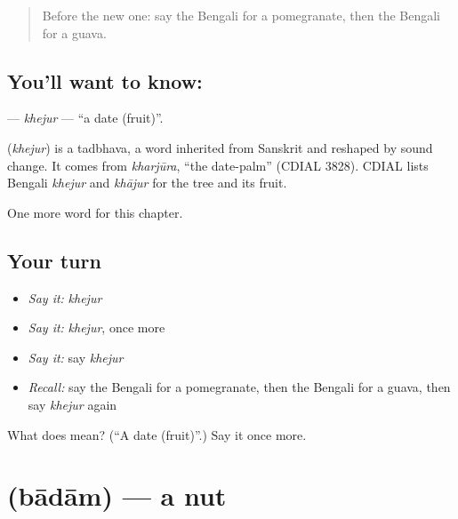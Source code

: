 \label{lesson:BN-C204-khejur}



\begin{quote}
Before the new one: say the Bengali for a pomegranate, then the Bengali for a guava.
\end{quote}

\subsection*{You'll want to know: }
\textbf{} — \emph{khejur} — \textquotedblleft{}a date (fruit)\textquotedblright{}.

\begin{cousinweb}
\textbf{} (\emph{khejur}) is a tadbhava, a word inherited from Sanskrit and reshaped by sound change. It comes from \emph{kharjūra}, \textquotedblleft{}the date-palm\textquotedblright{} (CDIAL 3828). CDIAL lists Bengali \emph{khejur} and \emph{khājur} for the tree and its fruit.
\end{cousinweb}

\begin{grammarlens}[title={What you've built}]
One more word for this chapter.
\end{grammarlens}

\subsection*{Your turn}
\begin{itemize}
\raggedright
  \item \emph{Say it:} \emph{khejur}
  \item \emph{Say it:} \emph{khejur}, once more
  \item \emph{Say it:} say \emph{khejur}
  \item \emph{Recall:} say the Bengali for a pomegranate, then the Bengali for a guava, then say \emph{khejur} again
\end{itemize}

\begin{tcolorbox}[breakable,colback=teal!4,colframe=teal!35!black,title={Before you move on}]
What does  mean? (\textquotedblleft{}A date (fruit)\textquotedblright{}.) Say it once more.
\end{tcolorbox}
\section[\texorpdfstring{\bn{বাদাম} (bādām)}{বাদাম (bādām)}]{ (bādām) — a nut}

